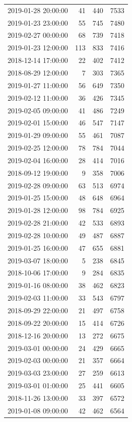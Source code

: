 \begin{tabular}{lrrr}
2019-01-28 20:00:00 & 41 & 440 & 7533 \\
2019-01-23 23:00:00 & 55 & 745 & 7480 \\
2019-02-27 00:00:00 & 68 & 739 & 7418 \\
2019-01-23 12:00:00 & 113 & 833 & 7416 \\
2018-12-14 17:00:00 & 22 & 402 & 7412 \\
2018-08-29 12:00:00 & 7 & 303 & 7365 \\
2019-01-27 11:00:00 & 56 & 649 & 7350 \\
2019-02-12 11:00:00 & 36 & 426 & 7345 \\
2019-02-05 09:00:00 & 41 & 486 & 7249 \\
2019-02-01 15:00:00 & 46 & 547 & 7147 \\
2019-01-29 09:00:00 & 55 & 461 & 7087 \\
2019-02-25 12:00:00 & 78 & 784 & 7044 \\
2019-02-04 16:00:00 & 28 & 414 & 7016 \\
2018-09-12 19:00:00 & 9 & 358 & 7006 \\
2019-02-28 09:00:00 & 63 & 513 & 6974 \\
2019-01-25 15:00:00 & 48 & 648 & 6964 \\
2019-01-28 12:00:00 & 98 & 784 & 6925 \\
2019-02-28 21:00:00 & 42 & 533 & 6893 \\
2019-02-28 10:00:00 & 49 & 487 & 6887 \\
2019-01-25 16:00:00 & 47 & 655 & 6881 \\
2019-03-07 18:00:00 & 5 & 238 & 6845 \\
2018-10-06 17:00:00 & 9 & 284 & 6835 \\
2019-01-16 08:00:00 & 38 & 462 & 6823 \\
2019-02-03 11:00:00 & 33 & 543 & 6797 \\
2018-09-29 22:00:00 & 21 & 497 & 6758 \\
2018-09-22 20:00:00 & 15 & 414 & 6726 \\
2018-12-16 20:00:00 & 13 & 272 & 6675 \\
2019-03-01 00:00:00 & 24 & 429 & 6665 \\
2019-02-03 00:00:00 & 21 & 357 & 6664 \\
2019-03-03 23:00:00 & 27 & 259 & 6613 \\
2019-03-01 01:00:00 & 25 & 441 & 6605 \\
2018-11-26 13:00:00 & 33 & 397 & 6572 \\
2019-01-08 09:00:00 & 42 & 462 & 6564 \\

\end{tabular}
